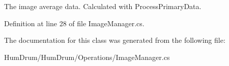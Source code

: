 The image average data. Calculated with Process\+Primary\+Data. 



Definition at line 28 of file Image\+Manager.\+cs.



The documentation for this class was generated from the following file\+:\begin{DoxyCompactItemize}
\item 
Hum\+Drum/\+Hum\+Drum/\+Operations/Image\+Manager.\+cs\end{DoxyCompactItemize}
